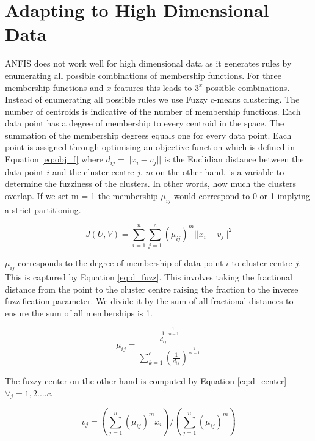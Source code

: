 \section{Adapting to High Dimensional Data}
\label{high_dim}


ANFIS does not work well for high dimensional data as it generates rules by enumerating all possible combinations of membership functions. For three membership functions and $x$ features this leads to $3^x$ possible combinations. Instead of enumerating all possible rules we use Fuzzy c-means clustering. The number of centroids is indicative of the number of membership functions. Each data point has a degree of membership to every centroid in the space. The summation of the membership degrees equals one for every data point. Each point is assigned through optimising an objective function which is defined in Equation \ref{eq:obj_f} where $d_{ij} = ||x_i - v_j||$ is the Euclidian distance between the data point $i$ and the cluster centre $j$. $m$ on the other hand, is a variable to determine the fuzziness of the clusters. In other words, how much the clusters overlap. If we set m = 1 the membership $\mu_{ij}$ would correspond to 0 or 1 implying a strict partitioning.

\begin{equation} \label{eq:obj_f}
J(U,V) = \sum\limits_{i=1} ^n \sum\limits_{j=1} ^c (\mu_{ij})^m ||x_i - v_j||^2
 \end{equation}

$\mu_{ij}$ corresponds to the degree of membership of data point $i$ to cluster centre $j$. This is captured by Equation \ref{eq:d_fuzz}. This involves taking the fractional distance from the point to the cluster centre raising the fraction to the inverse fuzzification parameter. We divide it by the sum of all fractional distances to ensure the sum of all memberships is 1. 


\begin{equation} \label{eq:d_fuzz}
\mu_{ij} = \frac { \frac {1} {d_{ij}} ^{ \frac{1}{m-1}} } { \sum\limits_{k=1} ^c (\frac {1} {d_{ik}  } ) ^ { \frac{1}{m-1}} }
 \end{equation}



The fuzzy center on the other hand is computed by Equation \ref{eq:d_center} $\forall_j = 1,2....c$.

\begin{equation} \label{eq:d_center}
v_j = (\sum\limits_{j=1} ^n (\mu_{ij})^m x_i ) / (\sum\limits_{j=1} ^n (\mu_{ij})^m)
 \end{equation}

